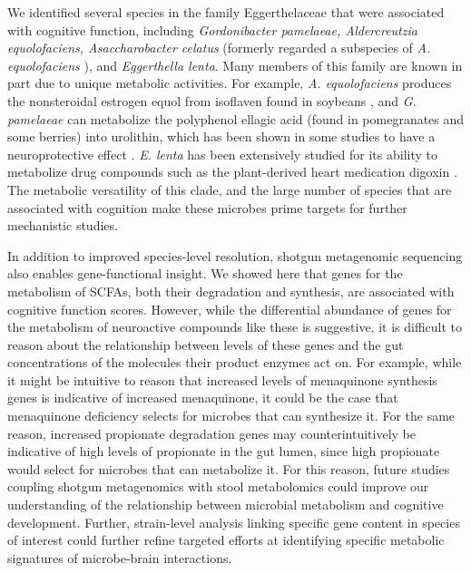 \documentclass[a4paper]{article}
\begin{document}
We identified several species in the family Eggerthelaceae that were
associated with cognitive function, including \emph{Gordonibacter
pamelaeae, Aldercreutzia equolofaciens, Asaccharobacter celatus}
(formerly regarded a subspecies of \emph{A. equolofaciens}
\citep{takahashiCompleteGenomeSequence2021}),
and \emph{Eggerthella lenta}. Many members of this family are
known in part due to unique metabolic activities. For example, \emph{A.
equolofaciens} produces the nonsteroidal estrogen equol from isoflaven
found in soybeans
\citep{wangEnantioselectiveSynthesisSEquol2005},
and \emph{G. pamelaeae} can metabolize the polyphenol ellagic acid
(found in pomegranates and some berries) into urolithin, which has been
shown in some studies to have a neuroprotective effect
\citep{gongUrolithinAlleviatesBloodbrain2022,selmaDescriptionUrolithinProduction2014}.
\emph{E. lenta} has been extensively studied for
its ability to metabolize drug compounds such as the plant-derived heart
medication digoxin
\citep{haiserPredictingManipulatingCardiac2013}.
The metabolic versatility of this clade, and the large number of
species that are associated with cognition make these microbes prime
targets for further mechanistic studies.

In addition to improved species-level resolution, shotgun metagenomic
sequencing also enables gene-functional insight. We showed here that
genes for the metabolism of SCFAs, both their degradation and synthesis,
are associated with cognitive function scores. However, while the
differential abundance of genes for the metabolism of neuroactive
compounds like these is suggestive, it is difficult to reason about the
relationship between levels of these genes and the gut concentrations of
the molecules their product enzymes act on. For example, while it might
be intuitive to reason that increased levels of menaquinone synthesis
genes is indicative of increased menaquinone, it could be the case that
menaquinone deficiency selects for microbes that can synthesize it. For
the same reason, increased propionate degradation genes may
counterintuitively be indicative of high levels of propionate in the gut
lumen, since high propionate would select for microbes that can
metabolize it. For this reason, future studies coupling shotgun
metagenomics with stool metabolomics could improve our understanding of
the relationship between microbial metabolism and cognitive development.
Further, strain-level analysis linking specific gene content in species
of interest could further refine targeted efforts at identifying
specific metabolic signatures of microbe-brain interactions.
\end{document}
